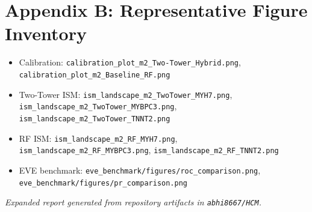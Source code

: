 \documentclass[11pt,a4paper]{article}
\begin{document}
\section*{Appendix B: Representative Figure Inventory}
\begin{itemize}[leftmargin=1.2cm]
    \item Calibration: \texttt{calibration\_plot\_m2\_Two-Tower\_Hybrid.png}, \texttt{calibration\_plot\_m2\_Baseline\_RF.png}
    \item Two-Tower ISM: \texttt{ism\_landscape\_m2\_TwoTower\_MYH7.png}, \texttt{ism\_landscape\_m2\_TwoTower\_MYBPC3.png}, \texttt{ism\_landscape\_m2\_TwoTower\_TNNT2.png}
    \item RF ISM: \texttt{ism\_landscape\_m2\_RF\_MYH7.png}, \texttt{ism\_landscape\_m2\_RF\_MYBPC3.png}, \texttt{ism\_landscape\_m2\_RF\_TNNT2.png}
    \item EVE benchmark: \texttt{eve\_benchmark/figures/roc\_comparison.png}, \texttt{eve\_benchmark/figures/pr\_comparison.png}
\end{itemize}

\vfill
\textit{Expanded report generated from repository artifacts in \texttt{abhi8667/HCM}.}
\end{document}
